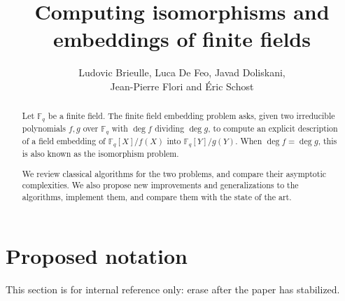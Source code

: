 \documentclass[12pt]{article}
\title{Computing isomorphisms and embeddings of finite fields}
\author{Ludovic Brieulle, Luca De Feo, Javad Doliskani,\\ Jean-Pierre
  Flori and \'Eric Schost}
\theoremstyle{plain}
\theoremstyle{definition}
\def\F{\ensuremath{\mathbb{F}}}
\newcounter{algorithm}
\begin{document}
\maketitle
\begin{abstract}
  Let $\F_q$ be a finite field.  The finite field embedding problem
  asks, given two irreducible polynomials $f,g$ over $\F_q$ with $\deg
  f$ dividing $\deg g$, to compute an explicit description of a field
  embedding of $\F_q[X]/f(X)$ into $\F_q[Y]/g(Y)$. When $\deg f = \deg
  g$, this is also known as the isomorphism problem.
  
  We review classical algorithms for the two problems, and compare
  their asymptotic complexities. We also propose new improvements and
  generalizations to the algorithms, implement them, and compare them
  with the state of the art.
\end{abstract}

\setcounter{tocdepth}{2}
\tableofcontents


\section*{Proposed notation}

This section is for internal reference only: erase after the paper has
stabilized.
\end{document}

